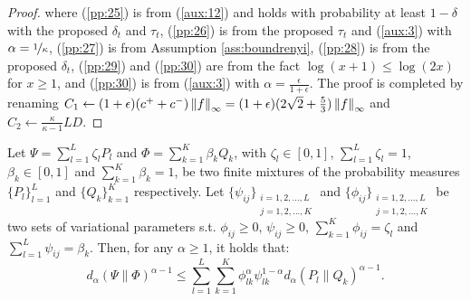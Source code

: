 \begin{proof}
	where (\ref{pp:25}) is from (\ref{aux:12}) and holds with probability at least $1-\delta$ with the proposed $\delta_t$ and $\tau_t$, (\ref{pp:26}) is from the proposed $\tau_t$ and (\ref{aux:3}) with $\alpha=\nicefrac{1}{\kappa}$,  (\ref{pp:27}) is from Assumption \ref{ass:boundrenyi}, (\ref{pp:28}) is from the proposed $\delta_t$, (\ref{pp:29}) and (\ref{pp:30}) are from the fact $\log(x+1)\leq\log(2x)$ for $x\geq 1$, and (\ref{pp:30}) is from (\ref{aux:3}) with $\alpha=\frac{\epsilon}{1+\epsilon}$. The proof is completed by renaming ${C_1\gets(1+\epsilon)(c^{+}+c^{-})\norm[\infty]{f} = (1+\epsilon)(2\sqrt{2}+\frac{5}{3})\norm[\infty]{f}}$ and $C_2\gets\frac{\kappa}{\kappa-1}LD$.
\end{proof}

\begin{lemma}
	Let $\Psi = \sum_{l=1}^L \zeta_l P_l$ and $\Phi = \sum_{k=1}^K \beta_k Q_k$, with $\zeta_l \in [0,1]$, $\sum_{l=1}^L \zeta_l =1$, $\beta_k \in [0,1]$ and $\sum_{k=1}^K \beta_k =1$, be two finite mixtures of the probability measures $\{P_l\}_{l=1}^L$ and $\{Q_k\}_{k=1}^K$ respectively. Let $\{ \psi_{ij} \}_{\substack{i=1,2,...,L \\ j=1,2,...,K}}$ and $\{ \phi_{ij} \}_{\substack{i=1,2,...,L \\ j=1,2,...,K}}$ be two sets of variational parameters s.t. $\phi_{ij} \ge 0$, $\psi_{ij} \ge 0$, $\sum_{k=1}^K \phi_{ij}=\zeta_l$ and $\sum_{l=1}^L \psi_{ij}=\beta_k$. Then, for any $\alpha \ge 1$, it holds that: 
     \begin{equation*}
        d_{\alpha} (\Psi \| \Phi)^{\alpha-1} \le \sum_{l=1}^L \sum_{k=1}^K \phi_{lk}^\alpha \psi_{lk}^{1-\alpha} d_{\alpha} (P_l \| Q_k)^{\alpha-1}.
    \end{equation*}
\end{lemma}

